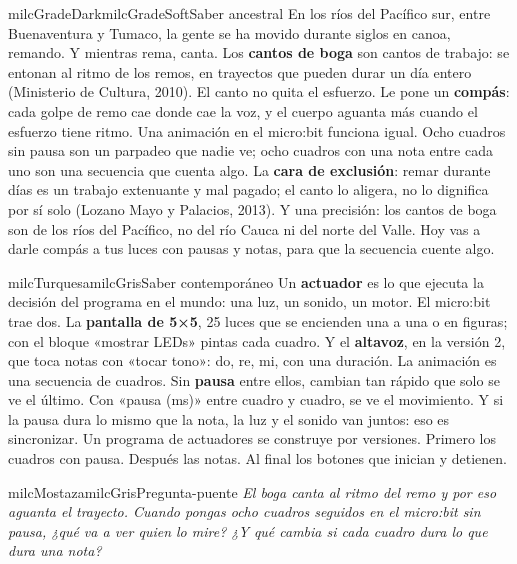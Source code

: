 \documentclass[11pt,letterpaper]{article}
\begin{document}
\begin{softbox}{milcGradeDark}{milcGradeSoft}{Saber ancestral}
En los ríos del Pacífico sur, entre Buenaventura y Tumaco, la gente se ha movido durante siglos en canoa, remando. Y mientras rema, canta. Los \textbf{cantos de boga} son cantos de trabajo: se entonan al ritmo de los remos, en trayectos que pueden durar un día entero (Ministerio de Cultura, 2010). El canto no quita el esfuerzo. Le pone un \textbf{compás}: cada golpe de remo cae donde cae la voz, y el cuerpo aguanta más cuando el esfuerzo tiene ritmo. Una animación en el micro:bit funciona igual. Ocho cuadros sin pausa son un parpadeo que nadie ve; ocho cuadros con una nota entre cada uno son una secuencia que cuenta algo. La \textbf{cara de exclusión}: remar durante días es un trabajo extenuante y mal pagado; el canto lo aligera, no lo dignifica por sí solo (Lozano Mayo y Palacios, 2013). Y una precisión: los cantos de boga son de los ríos del Pacífico, no del río Cauca ni del norte del Valle. Hoy vas a darle compás a tus luces con pausas y notas, para que la secuencia cuente algo.\par{}
\end{softbox}

\begin{softbox}{milcTurquesa}{milcGris}{Saber contemporáneo}
Un \textbf{actuador} es lo que ejecuta la decisión del programa en el mundo: una luz, un sonido, un motor. El micro:bit trae dos. La \textbf{pantalla de 5×5}, 25 luces que se encienden una a una o en figuras; con el bloque «mostrar LEDs» pintas cada cuadro. Y el \textbf{altavoz}, en la versión 2, que toca notas con «tocar tono»: do, re, mi, con una duración. La animación es una secuencia de cuadros. Sin \textbf{pausa} entre ellos, cambian tan rápido que solo se ve el último. Con «pausa (ms)» entre cuadro y cuadro, se ve el movimiento. Y si la pausa dura lo mismo que la nota, la luz y el sonido van juntos: eso es sincronizar. Un programa de actuadores se construye por versiones. Primero los cuadros con pausa. Después las notas. Al final los botones que inician y detienen.
\end{softbox}

\begin{softbox}{milcMostaza}{milcGris}{Pregunta-puente}
\textit{El boga canta al ritmo del remo y por eso aguanta el trayecto. Cuando pongas ocho cuadros seguidos en el micro:bit sin pausa, ¿qué va a ver quien lo mire? ¿Y qué cambia si cada cuadro dura lo que dura una nota?}
\end{softbox}
\end{document}
